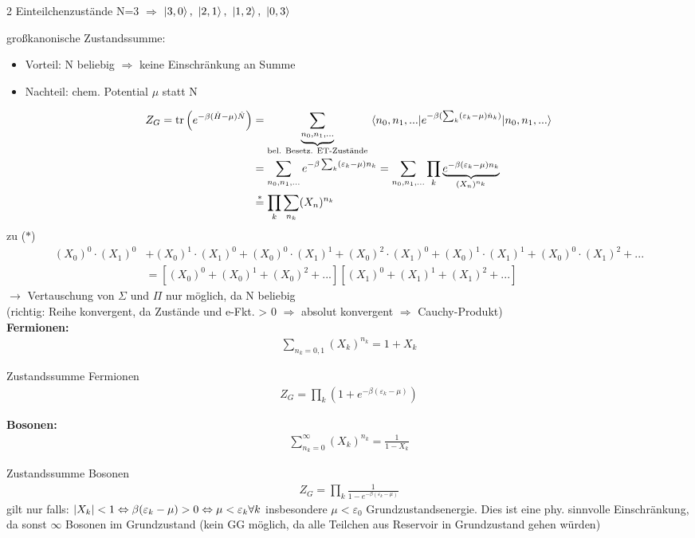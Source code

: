 \begin{beispiel}{2 Einteilchenzustände}
    N=3 $\Rightarrow$ $\ket{3,0}, \ \ket{2,1}, \ \ket{1,2},\ \ket{0,3}$
\end{beispiel}

großkanonische Zustandssumme:
\begin{itemize}
    \item Vorteil: N beliebig $\Rightarrow$ keine Einschränkung an Summe
    \item Nachteil: chem. Potential $\mu$ statt N
\end{itemize}
\begin{align}
    Z_G =  \trace\left( e^{-\beta (\hat{H}-\mu) \hat{N}}\right)&= \underbrace{\sum_{n_0,n_1,...}}_{\text{bel. Besetz. ET-Zustände}} \ev{e^{-\beta ( \sum_k (\varepsilon_k-\mu) \hat{n}_k)}}{n_0,n_1,...}\\
    &= \sum_{n_0,n_1,...} e^{-\beta \sum_k(\varepsilon_k-\mu)n_k}=\sum_{n_0,n_1,...} \prod_k \underbrace{e^{-\beta(\varepsilon_k-\mu)n_k}}_{(X_n)^{n_k}} \\
    &\overset{*}{=} \prod_k \sum_{n_k} (X_n)^{n_k}
\end{align}
zu ($*$)
\begin{align}
    (X_0)^0\cdot(X_1)^0 &+ (X_0)^1\cdot(X_1)^0 + (X_0)^0\cdot(X_1)^1 + (X_0)^2\cdot(X_1)^0 + (X_0)^1\cdot(X_1)^1 + (X_0)^0\cdot(X_1)^2 + ... \\
    &= \left[ (X_0)^0 + (X_0)^1 + (X_0)^2 + ... \right] \left[ (X_1)^0 + (X_1)^1 + (X_1)^2 + ... \right]
\end{align}
$\rightarrow$ Vertauschung von $\Sigma$ und $\Pi$ nur möglich, da N beliebig\\
(richtig: Reihe konvergent, da Zustände und e-Fkt. > 0 $\Rightarrow$ absolut konvergent $\Rightarrow$ Cauchy-Produkt)\\
\textbf{Fermionen:}
\begin{align}
    \sum_{n_k=0,1} (X_k)^{n_k} = 1 + X_k
\end{align}
\begin{definition}{Zustandssumme Fermionen}
    \begin{align}
        Z_G = \prod_k (1+ e^{-\beta(\varepsilon_k - \mu)})
    \end{align}
\end{definition}
\textbf{Bosonen:}
\begin{align}
    \sum_{n_k=0}^\infty (X_k)^{n_k} = \frac{1}{1-X_k}
\end{align}
\begin{definition}{Zustandssumme Bosonen}
    \begin{align}
        Z_G = \prod_k \frac{1}{1-e^{-\beta(\varepsilon_k-\mu)}}
    \end{align}
    gilt nur falls: $ \abs{X_k}<1 \Leftrightarrow \beta(\varepsilon_k-\mu) > 0 \Leftrightarrow \mu < \varepsilon_k \forall k$ insbesondere $\mu < \varepsilon_0$ Grundzustandsenergie. Dies ist eine phy. sinnvolle Einschränkung, da sonst $\infty$ Bosonen im Grundzustand (kein GG möglich, da alle Teilchen aus Reservoir in Grundzustand gehen würden)
\end{definition}

